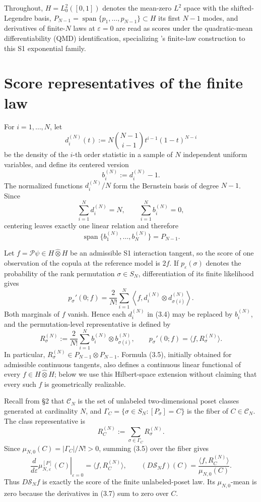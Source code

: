 \documentclass[11pt]{article}
\begin{document}
Throughout, $H=L_0^2([0,1])$ denotes the mean-zero $L^2$ space with the shifted-Legendre basis, $P_{N-1}=\operatorname{span}\{p_1,\ldots, p_{N-1}\}\subset H$ its first $N-1$ modes, and derivatives of finite-$N$ laws at $\varepsilon=0$ are read as scores under the quadratic-mean differentiability (QMD) identification, specializing \citet{Bombelli2000}'s finite-law construction to this S1 exponential family.

\section{Score representatives of the finite law}

For \(i=1,\ldots,N\), let \[ d_i^{(N)}(t) :=N\binom{N-1}{i-1}t^{i-1}(1-t)^{N-i} \tag{3.1} \] be the density of the \(i\)-th order statistic in a sample of \(N\) independent uniform variables, and define its centered version \[ b_i^{(N)}:=d_i^{(N)}-1. \tag{3.2} \] The normalized functions \(d_i^{(N)}/N\) form the Bernstein basis of degree \(N-1\). Since \[ \sum_{i=1}^N d_i^{(N)}=N, \qquad \sum_{i=1}^N b_i^{(N)}=0, \] centering leaves exactly one linear relation and therefore \[ \operatorname{span}\{b_1^{(N)},\ldots,b_N^{(N)}\}=P_{N-1}. \tag{3.3} \]

Let \(f=\mathcal P\psi\in H\widehat\otimes H\) be an admissible S1 interaction tangent, so the score of one observation of the copula at the reference model is \(2f\). If \(p_\varepsilon(\sigma)\) denotes the probability of the rank permutation \(\sigma\in S_N\), differentiation of its finite likelihood gives \[ p_\sigma'(0;f) =\frac2{N!}\sum_{i=1}^N \left\langle f, d_i^{(N)}\otimes d_{\sigma(i)}^{(N)}\right\rangle. \tag{3.4} \] Both marginals of \(f\) vanish. Hence each \(d_i^{(N)}\) in (3.4) may be replaced by \(b_i^{(N)}\), and the permutation-level representative is defined by \[ \boxed{ R_\sigma^{(N)} :=\frac2{N!}\sum_{i=1}^N b_i^{(N)}\otimes b_{\sigma(i)}^{(N)}, \qquad p_\sigma'(0;f)=\langle f,R_\sigma^{(N)}\rangle.} \tag{3.5} \] In particular, \(R_\sigma^{(N)}\in P_{N-1}\otimes P_{N-1}\). Formula (3.5), initially obtained for admissible continuous tangents, also defines a continuous linear functional of every \(f\in H\widehat\otimes H\); below we use this Hilbert-space extension without claiming that every such \(f\) is geometrically realizable.

Recall from \S2 that \(\mathcal C_N\) is the set of unlabeled two-dimensional poset classes generated at cardinality \(N\), and \(\Gamma_C=\{\sigma\in S_N:[P_\sigma]=C\}\) is the fiber of \(C\in\mathcal C_N\). The class representative is \[ \boxed{ R_C^{(N)}:=\sum_{\sigma\in\Gamma_C}R_\sigma^{(N)}.} \tag{3.6} \] Since \(\mu_{N,0}(C)=|\Gamma_C|/N!>0\), summing (3.5) over the fiber gives \[ \left.\frac{d}{d\varepsilon} \mu_{N,\varepsilon}^{[P]}(C)\right|_{\varepsilon=0} =\langle f,R_C^{(N)}\rangle, \qquad (D\mathscr S_Nf)(C) =\frac{\langle f,R_C^{(N)}\rangle}{\mu_{N,0}(C)}. \tag{3.7} \] Thus \(D\mathscr S_Nf\) is exactly the score of the finite unlabeled-poset law. Its \(\mu_{N,0}\)-mean is zero because the derivatives in (3.7) sum to zero over \(C\).
\end{document}
